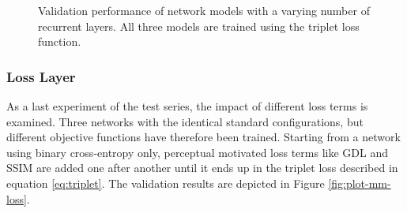 \begin{figure}[htb]
\begin{subfigure}{0.5\textwidth}
{
  }
  \caption{}
  \label{fig:plot-mm-layer-psnr}
\end{subfigure}
\caption[Influences of ConvLSTM Layers]{Validation performance of network models with a varying number of recurrent layers. All three models are trained using the triplet loss function.} \label{fig:plot-mm-layer}
\end{figure}



\subsubsection*{Loss Layer}

As a last experiment of the test series, the impact of different loss terms is examined. Three networks with the identical standard configurations, but different objective functions have therefore been trained. Starting from a network using binary cross-entropy only, perceptual motivated loss terms like GDL and SSIM are added one after another until it ends up in the triplet loss described in equation \ref{eq:triplet}. The validation results are depicted in Figure \ref{fig:plot-mm-loss}.

